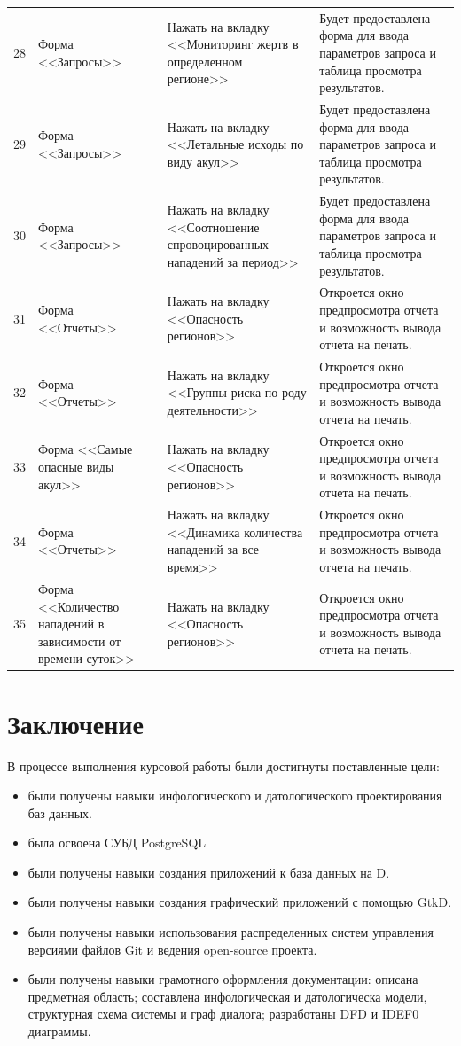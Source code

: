 \documentclass[russian,utf8,simple,emptystyle]{eskdtext}
\begin{document}
\begin{longtable}{c | L{3cm} | L{6cm} | L{6cm} }
	28 & Форма <<Запросы>> & Нажать на вкладку <<Мониторинг жертв в определенном регионе>> & Будет предоставлена форма для ввода параметров запроса и таблица просмотра результатов. \\
	29 & Форма <<Запросы>> & Нажать на вкладку <<Летальные исходы по виду акул>> & Будет предоставлена форма для ввода параметров запроса и таблица просмотра результатов. \\
	30 & Форма <<Запросы>> & Нажать на вкладку <<Соотношение спровоцированных нападений за период>> & Будет предоставлена форма для ввода параметров запроса и таблица просмотра результатов. \\
	31 & Форма <<Отчеты>> & Нажать на вкладку <<Опасность регионов>> & Откроется окно предпросмотра отчета и возможность вывода отчета на печать. \\
	32 & Форма <<Отчеты>> & Нажать на вкладку <<Группы риска по роду деятельности>> & Откроется окно предпросмотра отчета и возможность вывода отчета на печать. \\
	33 & Форма <<Самые опасные виды акул>> & Нажать на вкладку <<Опасность регионов>> & Откроется окно предпросмотра отчета и возможность вывода отчета на печать. \\
	34 & Форма <<Отчеты>> & Нажать на вкладку <<Динамика количества нападений за все время>> & Откроется окно предпросмотра отчета и возможность вывода отчета на печать. \\
	35 & Форма <<Количество нападений в зависимости от времени суток>> & Нажать на вкладку <<Опасность регионов>> & Откроется окно предпросмотра отчета и возможность вывода отчета на печать. \\
\end{longtable}

\section{Заключение}
\normalsize
В процессе выполнения курсовой работы были достигнуты поставленные цели:
\begin{itemize}
\item были получены навыки инфологического и датологического проектирования баз данных.
\item была освоена СУБД PostgreSQL
\item были получены навыки создания приложений к база данных на D.
\item были получены навыки создания графический приложений с помощью GtkD.
\item были получены навыки использования распределенных систем управления версиями файлов Git и ведения open-source проекта.
\item были получены навыки грамотного оформления документации: описана предметная область; составлена инфологическая и датологическа модели, структурная схема системы и граф диалога; разработаны DFD и IDEF0 диаграммы.
\end{itemize}
\end{document}
